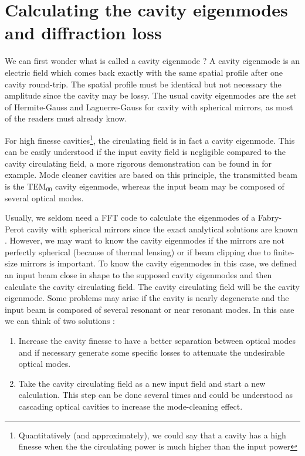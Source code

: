 \section{Calculating the cavity eigenmodes and diffraction loss}
\label{sec2:6}
We can first wonder what is called a cavity eigenmode ? A cavity eigenmode is an electric field which comes back exactly with the same spatial profile after one cavity round-trip. The spatial profile must be identical but not necessary the amplitude since the cavity may be lossy. The usual cavity eigenmodes are the set of Hermite-Gauss and Laguerre-Gauss for cavity with spherical mirrors, as most of the readers must already know.

For high finesse cavities\footnote{Quantitatively (and approximately), we could say that a cavity has a high finesse when the the circulating power is much higher than the input power}, the circulating field is in fact a cavity eigenmode. This can be easily understood if the input cavity field is negligible compared to the cavity circulating field, a more rigorous demonstration can be found in \cite{Saha:97} for example. Mode cleaner cavities are based on this principle, the transmitted beam is the TEM$_{00}$ cavity eigenmode, whereas the input beam may be composed of several optical modes.

Usually, we seldom need a FFT code to calculate the eigenmodes of a Fabry-Perot cavity with spherical mirrors since the exact analytical solutions are known \cite{Koechner}. However, we may want to know the cavity eigenmodes if the mirrors are not perfectly spherical (because of thermal lensing) or if beam clipping due to finite-size mirrors is important. To know the cavity eigenmodes in this case, we defined an input beam close in shape to the supposed cavity eigenmodes and then calculate the cavity circulating field. The cavity circulating field will be the cavity eigenmode. Some problems may arise if the cavity is nearly degenerate and the input beam is composed of several resonant or near resonant modes. In this case we can think of two solutions :
\begin{enumerate}
  \item Increase the cavity finesse to have a better separation between optical modes and if necessary generate some specific losses to attenuate the undesirable optical modes.
  \item Take the cavity circulating field as a new input field and start a new calculation. This step can be done several times and could be understood as cascading optical cavities to increase the mode-cleaning effect.
\end{enumerate}

